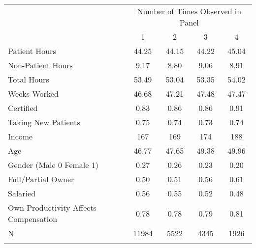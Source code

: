  \begin{tabular}{l*{4}{c}}
\midrule
                    &\multicolumn{4}{c}{ Number of Times Observed in Panel}\\
                    &           1&           2&           3&           4\\
\midrule
Patient Hours       &       44.25&       44.15&       44.22&       45.04\\
\addlinespace
Non-Patient Hours   &        9.17&        8.80&        9.06&        8.91\\
\addlinespace
Total Hours         &       53.49&       53.04&       53.35&       54.02\\
\addlinespace
Weeks Worked        &       46.68&       47.21&       47.48&       47.47\\
\addlinespace
Certified           &        0.83&        0.86&        0.86&        0.91\\
\addlinespace
Taking New Patients &        0.75&        0.74&        0.73&        0.74\\
\addlinespace
Income              &         167&         169&         174&         188\\
\addlinespace
Age                 &       46.77&       47.65&       49.38&       49.96\\
\addlinespace
Gender (Male 0 Female 1)&        0.27&        0.26&        0.23&        0.20\\
\addlinespace
Full/Partial Owner  &        0.50&        0.51&        0.56&        0.61\\
\addlinespace
Salaried            &        0.56&        0.55&        0.52&        0.48\\
\addlinespace
Own-Productivity Affects Compensation&        0.78&        0.78&        0.79&        0.81\\
\addlinespace
N                   &       11984&        5522&        4345&        1926\\
\addlinespace
\midrule
\midrule
\end{tabular}
